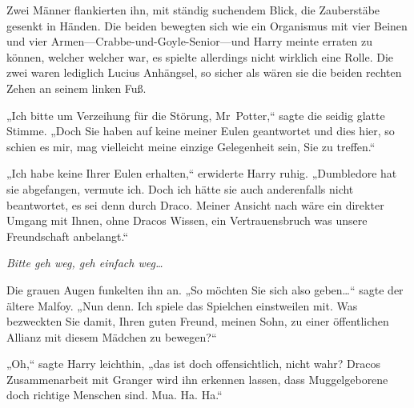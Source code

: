 Zwei Männer flankierten ihn, mit ständig suchendem Blick, die Zauberstäbe gesenkt in Händen. Die beiden bewegten sich wie ein Organismus mit vier Beinen und vier Armen—Crabbe-und-Goyle-Senior—und Harry meinte erraten zu können, welcher welcher war, es spielte allerdings nicht wirklich eine Rolle. Die zwei waren lediglich Lucius Anhängsel, so sicher als wären sie die beiden rechten Zehen an seinem linken Fuß.

„Ich bitte um Verzeihung für die Störung, Mr~Potter,“ sagte die seidig glatte Stimme. „Doch Sie haben auf keine meiner Eulen geantwortet und dies hier, so schien es mir, mag vielleicht meine einzige Gelegenheit sein, Sie zu treffen.“

„Ich habe keine Ihrer Eulen erhalten,“ erwiderte Harry ruhig. „Dumbledore hat sie abgefangen, vermute ich. Doch ich hätte sie auch anderenfalls nicht beantwortet, es sei denn durch Draco. Meiner Ansicht nach wäre ein direkter Umgang mit Ihnen, ohne Dracos Wissen, ein Vertrauensbruch was unsere Freundschaft anbelangt.“

\emph{Bitte geh weg, geh einfach weg…}

Die grauen Augen funkelten ihn an. „So möchten Sie sich also geben…“ sagte der ältere Malfoy. „Nun denn. Ich spiele das Spielchen einstweilen mit. Was bezweckten Sie damit, Ihren guten Freund, meinen Sohn, zu einer öffentlichen Allianz mit diesem Mädchen zu bewegen?“

„Oh,“ sagte Harry leichthin, „das ist doch offensichtlich, nicht wahr? Dracos Zusammenarbeit mit Granger wird ihn erkennen lassen, dass Muggelgeborene doch richtige Menschen sind. Mua. Ha. Ha.“

